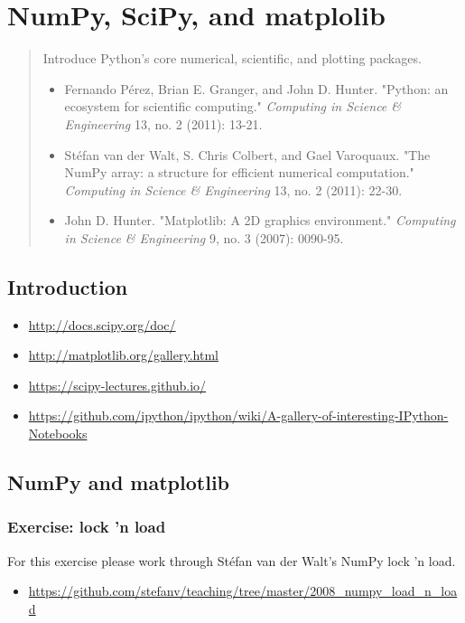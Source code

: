 \chapter{NumPy, SciPy, and matplolib}

\begin{abstract}
Introduce Python's core numerical, scientific, and plotting packages.

\begin{itemize}
\item Fernando Pérez, Brian E. Granger, and John D. Hunter. "Python: an ecosystem for
scientific computing." \emph{Computing in Science \& Engineering} 13, no. 2 (2011):
13-21.
\item Stéfan van der Walt, S. Chris Colbert, and Gael Varoquaux. "The NumPy array: a
structure for efficient numerical computation." \emph{Computing in Science \&
Engineering} 13, no. 2 (2011): 22-30.
\item John D. Hunter. "Matplotlib: A 2D graphics environment." \emph{Computing
in Science \& Engineering} 9, no. 3 (2007): 0090-95.
\end{itemize}
\end{abstract}

\section{Introduction}
\begin{itemize}
\item \url{http://docs.scipy.org/doc/}
\item \url{http://matplotlib.org/gallery.html}
\item \url{https://scipy-lectures.github.io/}
\item \url{https://github.com/ipython/ipython/wiki/A-gallery-of-interesting-IPython-Notebooks}
\end{itemize}

\section{NumPy and matplotlib}

\subsection{Exercise: lock 'n load}
For this exercise please work through Stéfan van der Walt's NumPy
lock 'n load.

\begin{itemize}
\item \url{https://github.com/stefanv/teaching/tree/master/2008_numpy_load_n_load}
\end{itemize}

